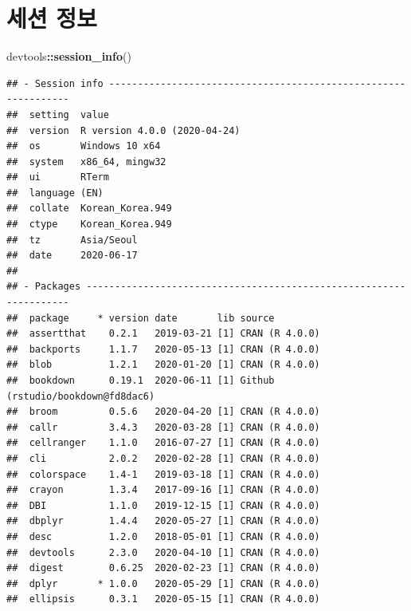 \documentclass[
  12pt,
]{krantz}
\newenvironment{Shaded}{\begin{snugshade}}{\end{snugshade}}
\newcommand{\KeywordTok}[1]{\textcolor[rgb]{0.13,0.29,0.53}{\textbf{#1}}}
\newcommand{\NormalTok}[1]{#1}
\newcommand{\OperatorTok}[1]{\textcolor[rgb]{0.81,0.36,0.00}{\textbf{#1}}}
\begin{document}
\hypertarget{session-info}{%
\chapter{세션 정보}\label{session-info}}

\begin{Shaded}
\begin{Highlighting}[]
\NormalTok{devtools}\OperatorTok{::}\KeywordTok{session\_info}\NormalTok{()}
\end{Highlighting}
\end{Shaded}

\begin{verbatim}
## - Session info ---------------------------------------------------------------
##  setting  value                       
##  version  R version 4.0.0 (2020-04-24)
##  os       Windows 10 x64              
##  system   x86_64, mingw32             
##  ui       RTerm                       
##  language (EN)                        
##  collate  Korean_Korea.949            
##  ctype    Korean_Korea.949            
##  tz       Asia/Seoul                  
##  date     2020-06-17                  
## 
## - Packages -------------------------------------------------------------------
##  package     * version date       lib source                           
##  assertthat    0.2.1   2019-03-21 [1] CRAN (R 4.0.0)                   
##  backports     1.1.7   2020-05-13 [1] CRAN (R 4.0.0)                   
##  blob          1.2.1   2020-01-20 [1] CRAN (R 4.0.0)                   
##  bookdown      0.19.1  2020-06-11 [1] Github (rstudio/bookdown@fd8dac6)
##  broom         0.5.6   2020-04-20 [1] CRAN (R 4.0.0)                   
##  callr         3.4.3   2020-03-28 [1] CRAN (R 4.0.0)                   
##  cellranger    1.1.0   2016-07-27 [1] CRAN (R 4.0.0)                   
##  cli           2.0.2   2020-02-28 [1] CRAN (R 4.0.0)                   
##  colorspace    1.4-1   2019-03-18 [1] CRAN (R 4.0.0)                   
##  crayon        1.3.4   2017-09-16 [1] CRAN (R 4.0.0)                   
##  DBI           1.1.0   2019-12-15 [1] CRAN (R 4.0.0)                   
##  dbplyr        1.4.4   2020-05-27 [1] CRAN (R 4.0.0)                   
##  desc          1.2.0   2018-05-01 [1] CRAN (R 4.0.0)                   
##  devtools      2.3.0   2020-04-10 [1] CRAN (R 4.0.0)                   
##  digest        0.6.25  2020-02-23 [1] CRAN (R 4.0.0)                   
##  dplyr       * 1.0.0   2020-05-29 [1] CRAN (R 4.0.0)                   
##  ellipsis      0.3.1   2020-05-15 [1] CRAN (R 4.0.0)                   

\end{verbatim}
\end{document}
